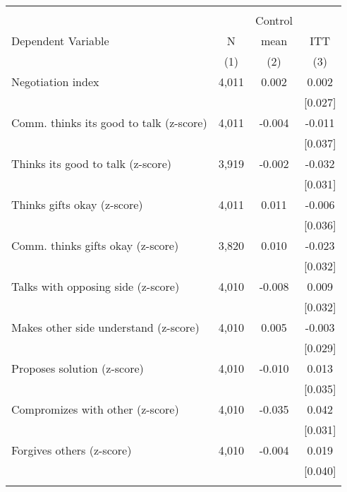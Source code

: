 \begin{tabular}{lccc}
\hline \noalign{\smallskip} &  &  & \\
 &  & Control & \\
Dependent Variable & N & mean & ITT\\
 & (1) & (2) & (3)\\
\noalign{\smallskip}\hline \noalign{\smallskip}\quad Negotiation index & 4,011 & 0.002 & 0.002\\
 &  &  & [0.027]\\
\quad Comm. thinks its good to talk (z-score) & 4,011 & -0.004 & -0.011\\
 &  &  & [0.037]\\
\quad Thinks its good to talk (z-score) & 3,919 & -0.002 & -0.032\\
 &  &  & [0.031]\\
\quad Thinks gifts okay (z-score) & 4,011 & 0.011 & -0.006\\
 &  &  & [0.036]\\
\quad Comm. thinks gifts okay (z-score) & 3,820 & 0.010 & -0.023\\
 &  &  & [0.032]\\
\quad Talks with opposing side (z-score) & 4,010 & -0.008 & 0.009\\
 &  &  & [0.032]\\
\quad Makes other side understand (z-score) & 4,010 & 0.005 & -0.003\\
 &  &  & [0.029]\\
\quad Proposes solution (z-score) & 4,010 & -0.010 & 0.013\\
 &  &  & [0.035]\\
\quad Compromizes with other (z-score) & 4,010 & -0.035 & 0.042\\
 &  &  & [0.031]\\
\quad Forgives others (z-score) & 4,010 & -0.004 & 0.019\\
 &  &  & [0.040]\\
\noalign{\smallskip}\hline\end{tabular}
